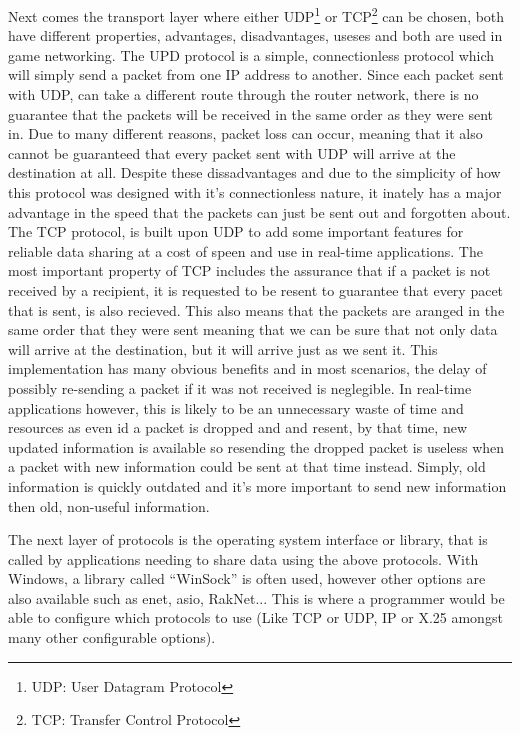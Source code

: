 Next comes the transport layer where either UDP\footnote{UDP: User Datagram Protocol} or TCP\footnote{TCP: Transfer Control Protocol}  can be chosen, both have different properties, advantages, disadvantages, useses and both are used in game networking. The UPD protocol is a simple, connectionless protocol which will simply send a packet from one IP address to another. Since each packet sent with UDP, can take a different route through the router network, there is no guarantee that the packets will be received in the same order as they were sent in. Due to many different reasons, packet loss can occur, meaning that it also cannot be guaranteed that every packet sent with UDP will arrive at the destination at all. Despite these dissadvantages and due to the simplicity of how this protocol was designed with it's connectionless nature, it inately has a major advantage in the speed that the packets can just be sent out and forgotten about. The TCP protocol, is built upon UDP to add some important features for reliable data sharing at a cost of speen and use in real-time applications. The most important property of TCP includes the assurance that if a packet is not received by a recipient, it is requested to be resent to guarantee that every pacet that is sent, is also recieved. This also means that the packets are aranged in the same order that they were sent meaning that we can be sure that not only data will arrive at the destination, but it will arrive just as we sent it. This implementation has many obvious benefits and in most scenarios, the delay of possibly re-sending a packet if it was not received is neglegible. In real-time applications however, this is likely to be an unnecessary waste of time and resources as even id a packet is dropped and and resent, by that time, new updated information is available so resending the dropped packet is useless when a packet with new information could be sent at that time instead. Simply, old information is quickly outdated and it's more important to send new information then old, non-useful information.

The next layer of protocols is the operating system interface or library, that is called by applications needing to share data using the above protocols. With Windows, a library called ``WinSock'' is often used, however other options are also available such as enet, asio, RakNet... This is where a programmer would be able to configure which protocols to use (Like TCP or UDP, IP or X.25 amongst many other configurable options).


